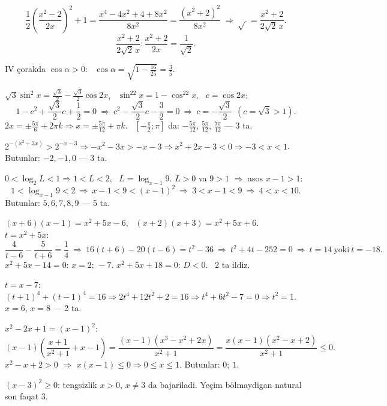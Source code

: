 \[\frac12\left(\frac{x^2-2}{2x}\right)^2+1=\frac{x^4-4x^2+4+8x^2}{8x^2}=\frac{(x^2+2)^2}{8x^2}\ \Rightarrow\ \sqrt{\ }=\frac{x^2+2}{2\sqrt2\,x}.\]
\[\frac{x^2+2}{2\sqrt2\,x}:\frac{x^2+2}{2x}=\frac1{\sqrt2}.\]

IV çorakda $\cos\alpha>0$: \ $\cos\alpha=\sqrt{1-\frac{16}{25}}=\frac35$.

$\sqrt3\sin^2x=\frac{\sqrt3}2-\frac{\sqrt3}2\cos2x$, \ $\sin^22x=1-\cos^22x$. \ $c=\cos2x$:
\[1-c^2+\frac{\sqrt3}2c+\frac12=0\ \Rightarrow\ c^2-\frac{\sqrt3}2c-\frac32=0\ \Rightarrow\ c=-\frac{\sqrt3}2\ \ (c=\sqrt3>1).\]
$2x=\pm\frac{5\pi}6+2\pi k\Rightarrow x=\pm\frac{5\pi}{12}+\pi k$. \ $\left[-\frac\pi2;\pi\right]$ da: $-\frac{5\pi}{12}$, $\frac{5\pi}{12}$, $\frac{7\pi}{12}$ — 3 ta.

$2^{-(x^2+3x)}>2^{-x-3}\Rightarrow -x^2-3x>-x-3\Rightarrow x^2+2x-3<0\Rightarrow -3<x<1$.\\
Butunlar: $-2,-1,0$ — 3 ta.

$0<\log_2L<1\Rightarrow 1<L<2$, \ $L=\log_{x-1}9$. $L>0$ va $9>1$ $\Rightarrow$ asos $x-1>1$:
\[1<\log_{x-1}9<2\ \Rightarrow\ x-1<9<(x-1)^2\ \Rightarrow\ 3<x-1<9\ \Rightarrow\ 4<x<10.\]
Butunlar: $5,6,7,8,9$ — 5 ta.

$(x+6)(x-1)=x^2+5x-6$, \ $(x+2)(x+3)=x^2+5x+6$. \ $t=x^2+5x$:
\[\frac4{t-6}-\frac5{t+6}=\frac14\ \Rightarrow\ 16(t+6)-20(t-6)=t^2-36\ \Rightarrow\ t^2+4t-252=0\ \Rightarrow\ t=14\ \text{yoki}\ t=-18.\]
$x^2+5x-14=0$: $x=2;\,-7$. \quad $x^2+5x+18=0$: $D<0$. \ 2 ta ildiz.

$t=x-7$: \ $(t+1)^4+(t-1)^4=16\Rightarrow 2t^4+12t^2+2=16\Rightarrow t^4+6t^2-7=0\Rightarrow t^2=1$.\\
$x=6$, $x=8$ — 2 ta.

$x^2-2x+1=(x-1)^2$:
\[(x-1)\left(\frac{x+1}{x^2+1}+x-1\right)=\frac{(x-1)(x^3-x^2+2x)}{x^2+1}=\frac{x(x-1)(x^2-x+2)}{x^2+1}\le0.\]
$x^2-x+2>0$ $\Rightarrow$ $x(x-1)\le0\Rightarrow0\le x\le1$. Butunlar: $0;\ 1$.

$(x-3)^2\ge0$: tengsizlik $x>0$, $x\ne3$ da bajariladi. Yeçim bölmaydigan natural son faqat $3$.

